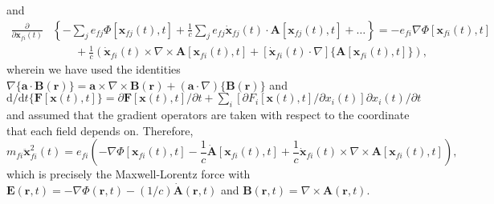 \documentclass{article}
\begin{document}
and
\begin{equation}
\begin{split}
\frac{\partial}{\partial \mathbf{x}_{fi}(t)}&\left\{-\sum_je_{fj}\Phi[\mathbf{x}_{fj}(t),t] + \frac{1}{c}\sum_je_{fj}\dot{\mathbf{x}}_{fj}(t)\cdot\mathbf{A}[\mathbf{x}_{fj}(t),t] + \ldots\right\} = -e_{fi}\nabla\Phi[\mathbf{x}_{fi}(t),t]\\
&\qquad + \frac{1}{c}\left(\dot{\mathbf{x}}_{fi}(t)\times\nabla\times\mathbf{A}[\mathbf{x}_{fi}(t),t] + \left[\dot{\mathbf{x}}_{fi}(t)\cdot\nabla\right]\{\mathbf{A}[\mathbf{x}_{fi}(t),t]\}\right),
\end{split}
\end{equation}
wherein we have used the identities $\nabla\{\mathbf{a}\cdot\mathbf{B}(\mathbf{r})\} = \mathbf{a}\times\nabla\times\mathbf{B}(\mathbf{r}) + (\mathbf{a}\cdot\nabla)\{\mathbf{B}(\mathbf{r})\}$ and $\mathrm{d}/\mathrm{d}t\{\mathbf{F}[\mathbf{x}(t),t]\} = \partial\mathbf{F}[\mathbf{x}(t),t]/\partial t + \sum_i[\partial F_i[\mathbf{x}(t),t]/\partial x_i(t)]\partial x_i(t)/\partial t $ and assumed that the gradient operators are taken with respect to the coordinate that each field depends on. Therefore,
\begin{equation}
m_{fi}\ddot{\mathbf{x}}_{fi}^2(t) = e_{fi}\left(-\nabla\Phi[\mathbf{x}_{fi}(t),t] - \frac{1}{c}\dot{\mathbf{A}}[\mathbf{x}_{fi}(t),t] + \frac{1}{c}\dot{\mathbf{x}}_{fi}(t)\times\nabla\times\mathbf{A}[\mathbf{x}_{fi}(t),t]\right),
\end{equation}
which is precisely the Maxwell-Lorentz force with $\mathbf{E}(\mathbf{r},t) = -\nabla\Phi(\mathbf{r},t) - (1/c)\dot{\mathbf{A}}(\mathbf{r},t)$ and $\mathbf{B}(\mathbf{r},t) = \nabla\times\mathbf{A}(\mathbf{r},t)$.
\end{document}
